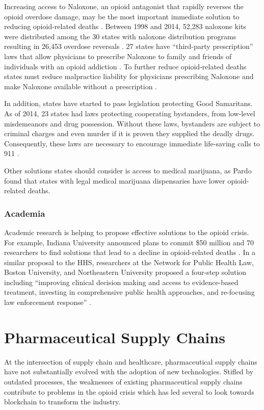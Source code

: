 \documentclass[sigconf]{acmart}
\begin{document}
Increasing access to Naloxone, an opioid antagonist that rapidly reverses the opioid overdose damage, may be the most important immediate solution to reducing opioid-related deaths \cite{Hawk01}. Between 1998 and 2014, 52,283 naloxone kits were distributed among the 30 states with naloxone distribution programs resulting in 26,453 overdose reversals \cite{Hawk01}. 27 states have ``third-party prescription'' laws that allow physicians to prescribe Naloxone to family and friends of individuals with an opioid addiction \cite{Hawk01}. To further reduce opioid-related deaths states must reduce malpractice liability for physicians prescribing Naloxone and make Naloxone available without a prescription \cite{Hawk01}.

In addition, states have started to pass legislation protecting Good Samaritans. As of 2014, 23 states had laws protecting cooperating bystanders, from low-level misdemeanors and drug possession. Without these laws, bystanders are subject to criminal charges and even murder if it is proven they supplied the deadly drugs. Consequently, these laws are necessary to encourage immediate life-saving calls to 911 \cite{Burris01} \cite{Hawk01}. 

Other solutions states should consider is access to medical marijuana, as Pardo \cite{pardo01} found that states with legal medical marijuana dispensaries have lower opioid-related deaths.

\subsubsection{Academia}
Academic research is helping to propose effective solutions to the opioid crisis. For example, Indiana University announced plans to commit \$50 million and 70 researchers to find solutions that lead to a decline in opioid-related deaths \cite{Rudavsky01}. In a similar proposal to the HHS, researchers at the Network for Public Health Law, Boston University, and Northeastern University proposed a four-step solution including ``improving clinical decision making and access to evidence-based treatment, investing in comprehensive public health approaches, and re-focusing law enforcement response'' \cite{Davis01}.





\section{Pharmaceutical Supply Chains}
At the intersection of supply chain and healthcare, pharmaceutical supply chains have not substantially evolved with the adoption of new technologies. Stifled by outdated processes, the weaknesses of existing pharmaceutical supply chains contribute to problems in the opioid crisis which has led several to look towards blockchain to transform the industry.
\end{document}
